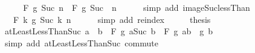 \begin{isabellebody}
%
\isatagproof
{}\isamarkupfalse%
\ {\isacharminus}{\kern0pt}\isanewline
\ \ \isamarkupfalse%
\ {\isachardoublequoteopen}F\ g\ {\isacharbraceleft}{\kern0pt}Suc\ {}{\isachardot}{\kern0pt}{\isachardot}{\kern0pt}n{\isacharbraceright}{\kern0pt}\ {\isacharequal}{\kern0pt}\ F\ g\ {\isacharparenleft}{\kern0pt}Suc\ {\isacharbackquote}{\kern0pt}\ {\isacharbraceleft}{\kern0pt}{\isachardot}{\kern0pt}{\isachardot}{\kern0pt}{\isacharless}{\kern0pt}n{\isacharbraceright}{\kern0pt}{\isacharparenright}{\kern0pt}{\isachardoublequoteclose}\isanewline
\ \ \ \ \isamarkupfalse%
\ {\isacharparenleft}{\kern0pt}simp\ add{\isacharcolon}{\kern0pt}\ image{\isacharunderscore}{\kern0pt}Suc{\isacharunderscore}{\kern0pt}lessThan{\isacharparenright}{\kern0pt}\isanewline
\ \ \isamarkupfalse%
\ \isamarkupfalse%
\ {\isachardoublequoteopen}{\isasymdots}\ {\isacharequal}{\kern0pt}\ F\ {\isacharparenleft}{\kern0pt}{\isasymlambda}k{\isachardot}{\kern0pt}\ g\ {\isacharparenleft}{\kern0pt}Suc\ k{\isacharparenright}{\kern0pt}{\isacharparenright}{\kern0pt}\ {\isacharbraceleft}{\kern0pt}{\isachardot}{\kern0pt}{\isachardot}{\kern0pt}{\isacharless}{\kern0pt}n{\isacharbraceright}{\kern0pt}{\isachardoublequoteclose}\isanewline
\ \ \ \ \isamarkupfalse%
\ {\isacharparenleft}{\kern0pt}simp\ add{\isacharcolon}{\kern0pt}\ reindex{\isacharparenright}{\kern0pt}\isanewline
\ \ \isamarkupfalse%
\ \isamarkupfalse%
\ {\isacharquery}{\kern0pt}thesis\ \isacommand{{\isachardot}{\kern0pt}}\isamarkupfalse%
\isanewline
{}\isamarkupfalse%
%
\endisatagproof
{\isafoldproof}%
%
\isadelimproof
\isanewline
%
\endisadelimproof
\isanewline
{}\isamarkupfalse%
\ atLeastLessThan{\isacharunderscore}{\kern0pt}Suc{\isacharcolon}{\kern0pt}\ {\isachardoublequoteopen}a\ {\isasymle}\ b\ {\isasymLongrightarrow}\ F\ g\ {\isacharbraceleft}{\kern0pt}a{\isachardot}{\kern0pt}{\isachardot}{\kern0pt}{\isacharless}{\kern0pt}Suc\ b{\isacharbraceright}{\kern0pt}\ {\isacharequal}{\kern0pt}\ F\ g\ {\isacharbraceleft}{\kern0pt}a{\isachardot}{\kern0pt}{\isachardot}{\kern0pt}{\isacharless}{\kern0pt}b{\isacharbraceright}{\kern0pt}\ \isactrlbold {\isacharasterisk}{\kern0pt}\ g\ b{\isachardoublequoteclose}\isanewline
%
\isadelimproof
\ \ %
\endisadelimproof
%
\isatagproof
{}\isamarkupfalse%
\ {\isacharparenleft}{\kern0pt}simp\ add{\isacharcolon}{\kern0pt}\ atLeastLessThanSuc\ commute{\isacharparenright}{\kern0pt}%
\endisatagproof
{\isafoldproof}%
%
\isadelimproof
\isanewline

\end{isabellebody}
